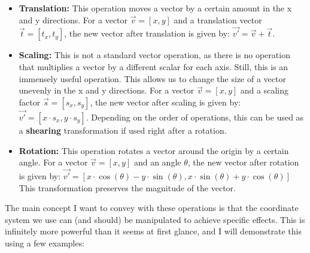\begin{itemize}
    \item \textbf{Translation:} This operation moves a vector by a certain amount in the x and y directions. For a vector \(\vec{v} = [x, y]\) and a translation vector \(\vec{t} = [t_x, t_y]\), the new vector after translation is given by: \(\vec{v'} = \vec{v} + \vec{t}\).

    \item \textbf{Scaling:} This is not a standard vector operation, as there is no operation that multiplies a vector by a different scalar for each axis. Still, this is an immensely useful operation. This allows us to change the size of a vector unevenly in the x and y directions. For a vector \(\vec{v} = [x, y]\) and a scaling factor \(\vec{s} = [s_x, s_y]\), the new vector after scaling is given by: \(\vec{v'} = [x \cdot s_x, y \cdot s_y]\). Depending on the order of operations, this can be used as a \textbf{shearing} transformation if used right after a rotation.

\pagebreak

    \item \textbf{Rotation:} This operation rotates a vector around the origin by a certain angle. For a vector \(\vec{v} = [x, y]\) and an angle \(\theta\), the new vector after rotation is given by: \linebreak \(\vec{v'} = [x \cdot \cos(\theta) - y \cdot \sin(\theta), x \cdot \sin(\theta) + y \cdot \cos(\theta)]\) This transformation preserves the magnitude of the vector.
\end{itemize}

\vspace{10mm}

The main concept I want to convey with these operations is that the coordinate system we use can (and should) be manipulated to achieve specific effects. This is infinitely more powerful than it seems at first glance, and I will demonstrate this using a few examples:

